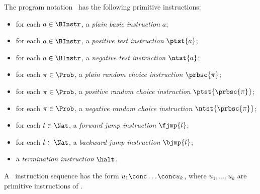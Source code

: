 \documentclass{llncs}
\begin{document}
The program notation \prPGLB\ has the following primitive instructions:
\begin{itemize}
\item
for each $a \in \BInstr$, a \emph{plain basic instruction} $a$;
\item
for each $a \in \BInstr$, a \emph{positive test instruction} $\ptst{a}$;
\item
for each $a \in \BInstr$, a \emph{negative test instruction} $\ntst{a}$;
\item
for each $\pi \in \Prob$, a \emph{plain random choice instruction} 
$\prbsc{\pi}$;
\item
for each $\pi \in \Prob$, a \emph{positive random choice instruction} 
$\ptst{\prbsc{\pi}}$;
\item
for each $\pi \in \Prob$, a \emph{negative random choice instruction} 
$\ntst{\prbsc{\pi}}$;
\item
for each $l \in \Nat$, a \emph{forward jump instruction}
$\fjmp{l}$;
\item
for each $l \in \Nat$, a \emph{backward jump instruction}
$\bjmp{l}$;
\item
a \emph{termination instruction} $\halt$.
\end{itemize}
A \prPGLB\ instruction sequence has the form
$u_1 \conc \ldots \conc u_k$, where $u_1,\ldots,u_k$ are primitive
instructions of \prPGLB.
\end{document}
